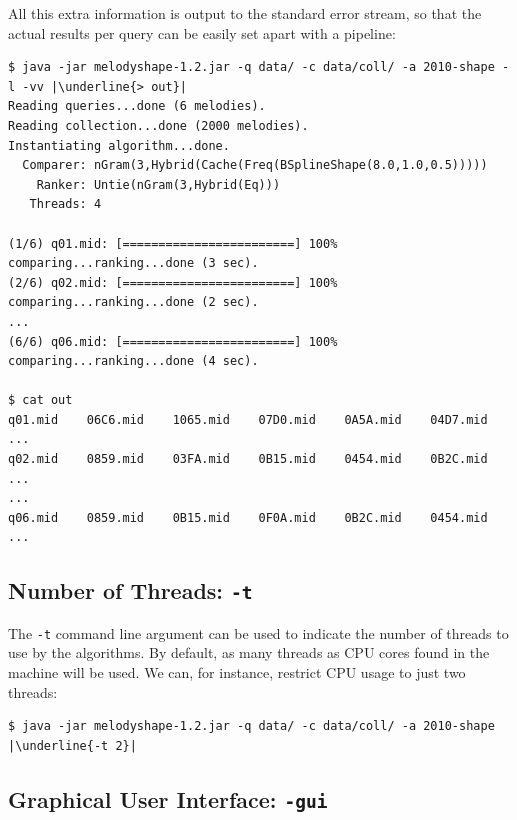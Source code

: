\documentclass[twoside]{article}
\begin{document}
All this extra information is output to the standard error stream, so that the actual results per query can be easily set apart with a pipeline:
\begin{lstlisting}
$ java -jar melodyshape-1.2.jar -q data/ -c data/coll/ -a 2010-shape -l -vv |\underline{> out}|
Reading queries...done (6 melodies).
Reading collection...done (2000 melodies).
Instantiating algorithm...done.
  Comparer: nGram(3,Hybrid(Cache(Freq(BSplineShape(8.0,1.0,0.5)))))
    Ranker: Untie(nGram(3,Hybrid(Eq)))
   Threads: 4
 
(1/6) q01.mid: [========================] 100% comparing...ranking...done (3 sec).
(2/6) q02.mid: [========================] 100% comparing...ranking...done (2 sec).
...
(6/6) q06.mid: [========================] 100% comparing...ranking...done (4 sec).

$ cat out
q01.mid    06C6.mid    1065.mid    07D0.mid    0A5A.mid    04D7.mid ...
q02.mid    0859.mid    03FA.mid    0B15.mid    0454.mid    0B2C.mid ...
...
q06.mid    0859.mid    0B15.mid    0F0A.mid    0B2C.mid    0454.mid ...
\end{lstlisting}

\subsection{Number of Threads: \texttt{-t}}

The \texttt{-t} command line argument can be used to indicate the number of threads to use by the algorithms. By default, as many threads as CPU cores found in the machine will be used. We can, for instance, restrict CPU usage to just two threads:
\begin{lstlisting}
$ java -jar melodyshape-1.2.jar -q data/ -c data/coll/ -a 2010-shape |\underline{-t 2}|
\end{lstlisting}

\subsection{Graphical User Interface: \texttt{-gui}}\label{ssec:gui}
\end{document}
